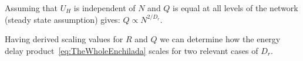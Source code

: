 \documentclass[12pt]{article}
\begin{document}
Assuming that $U_H$ is independent of $N$ and $Q$ is equal at all levels of the
network (steady state assumption) gives:
$ Q \propto  N^{2/D_r}$.  





Having derived scaling values for $R$ and $Q$ we can determine how the energy
delay product~\ref{eq:TheWholeEnchilada} scales for two relevant cases of $D_r$.

\begin{caseof}


\end{caseof}

\end{document}
